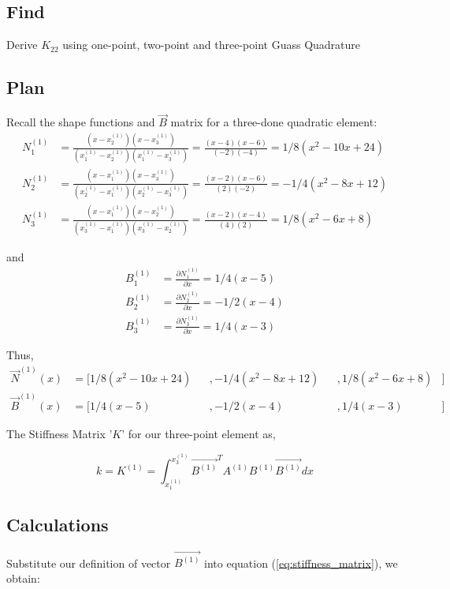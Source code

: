 \documentclass[a4paper]{memoir}
\begin{document}
\subsection{Find}
Derive $K_{22}$ using one-point, two-point and three-point Guass Quadrature

\subsection{Plan}
Recall the shape functions and $\vec{B}$ matrix for a three-done quadratic element:
\begin{align*}
	N_1^{(1)} &= \frac{(x-x_2^{(1)})(x-x_3^{(1)})}{(x_1^{(1)}-x_2^{(1)})(x_1^{(1)}-x_3^{(1)})} = \frac{(x-4)(x-6)}{(-2)(-4)} = 1/8 (x^2-10x+24) \\
	N_2^{(1)} &= \frac{(x-x_1^{(1)})(x-x_3^{(1)})}{(x_2^{(1)}-x_1^{(1)})(x_2^{(1)}-x_3^{(1)})} = \frac{(x-2)(x-6)}{(2)(-2)} = -1/4 (x^2-8x+12) \\
	N_3^{(1)} &= \frac{(x-x_1^{(1)})(x-x_2^{(1)})}{(x_3^{(1)}-x_1^{(1)})(x_3^{(1)}-x_2^{(1)})} = \frac{(x-2)(x-4)}{(4)(2)} = 1/8 (x^2-6x+8) 
\end{align*}

and 
\begin{align*}
	B_1^{(1)} &= \frac{\partial N_1^{(1)}}{\partial x} = 1/4 (x-5) \\
	B_2^{(1)} &= \frac{\partial N_2^{(1)}}{\partial x} = -1/2 (x-4) \\
	B_3^{(1)} &= \frac{\partial N_3^{(1)}}{\partial x} = 1/4 (x-3)
\end{align*}

Thus,
\begin{align*}
	\vec{N}^{(1)}(x) &= [1/8 (x^2-10x+24)& &,-1/4 (x^2-8x+12)& &,1/8 (x^2-6x+8) &] \\
	\vec{B}^{(1)}(x) &= [1/4 (x-5)& &,-1/2 (x-4)& &,1/4 (x-3) &]
\end{align*}

The Stiffness Matrix '$K$' for our three-point element as,

\begin{equation}
	k = K^{(1)} = \int_{x_1^{(1)}}^{x_3^{(1)}} \vec{B^{(1)}}^T A^{(1)} B^{(1)} \vec{B^{(1)}} dx
	\label{eq:stiffness_matrix}
\end{equation}

\subsection{Calculations}
Substitute our definition of vector $\vec{B^{(1)}}$ into equation (\ref{eq:stiffness_matrix}), we obtain:
\end{document}
